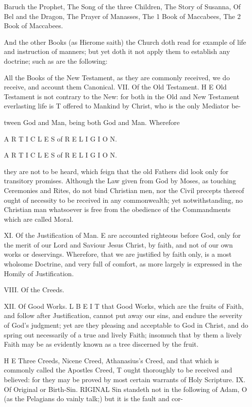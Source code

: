 Baruch the Prophet, The Song of the three Children, The Story of Susanna, Of Bel and the Dragon, The Prayer of Manasses, The 1 Book of Maccabees, The 2 Book of Maccabees.

And the other Books (as Hierome saith) the Church doth read for example of life and instruction of manners; but yet doth it not apply them to establish any doctrine; such as are the following:

All the Books of the New Testament, as they are commonly received, we do receive, and account them Canonical. VII. Of the Old Testament. H E Old Testament is not contrary to the New: for both in the Old and New Testament everlasting life is T offered to Mankind by Christ, who is the only Mediator be-

tween God and Man, being both God and Man. Wherefore

A R T I C L E S of R E L I G I O N.

A R T I C L E S of R E L I G I O N.

they are not to be heard, which feign that the old Fathers did look only for transitory promises. Although the Law given from God by Moses, as touching Ceremonies and Rites, do not bind Christian men, nor the Civil precepts thereof ought of necessity to be received in any commonwealth; yet notwithstanding, no Christian man whatsoever is free from the obedience of the Commandments which are called Moral.

XI. Of the Justification of Man. E are accounted righteous before God, only for the merit of our Lord and Saviour Jesus Christ, by faith, and not of our own works or deservings. Wherefore, that we are justified by faith only, is a most wholsome Doctrine, and very full of comfort, as more largely is expressed in the Homily of Justification.

VIII. Of the Creeds.

XII. Of Good Works. L B E I T that Good Works, which are the fruits of Faith, and follow after Justification, cannot put away our sins, and endure the severity of God’s judgment; yet are they pleasing and acceptable to God in Christ, and do spring out necessarily of a true and lively Faith; insomuch that by them a lively Faith may be as evidently known as a tree discerned by the fruit.

H E Three Creeds, Nicene Creed, Athanasius’s Creed, and that which is commonly called the Apostles Creed, T ought thoroughly to be received and believed: for they may be proved by most certain warrants of Holy Scripture. IX. Of Original or Birth-Sin. RIGINAL Sin standeth not in the following of Adam, O (as the Pelagians do vainly talk;) but it is the fault and cor-

